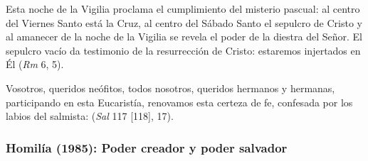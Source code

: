 \begin{body}
Esta noche de la Vigilia proclama el cumplimiento del misterio pascual: al centro del Viernes Santo está la Cruz, al centro del Sábado Santo el sepulcro de Cristo y al amanecer de la noche de la Vigilia se revela el poder de la diestra del Señor. El sepulcro vacío da testimonio de la resurrección de Cristo: estaremos injertados en Él  (\textit{Rm} 6, 5). 

Vosotros, queridos neófitos, todos nosotros, queridos hermanos y hermanas, participando en esta Eucaristía, renovamos esta certeza de fe, confesada por los labios del salmista:  (\textit{Sal} 117 [118], 17).
\end{body}


\subsubsection{Homilía (1985): Poder creador y poder salvador}



